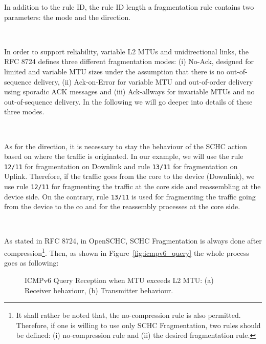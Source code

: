 In addition to the rule ID, the rule ID length a fragmentation rule contains two  parameters: the mode and the direction.

~

In order to support reliability, variable L2 MTUs and unidirectional links, the RFC 8724 defines three different fragmentation modes: (i) No-Ack, designed for limited and variable MTU sizes under the assumption that there is no out-of-sequence delivery, (ii) Ack-on-Error for variable MTU and out-of-order delivery using sporadic ACK messages and (iii) Ack-allways for invariable MTUs and no out-of-sequence delivery.
In the following we will go deeper into details of these three modes.

~

As for the direction, it is necessary to stay the behaviour of the SCHC action based on where the traffic is originated.
In our example, we will use the rule \texttt{12/11} for fragmentation on Downlink and rule \texttt{13/11} for fragmentation on Uplink.
Therefore, if the traffic goes from the core to the device (Downlink), we use rule \texttt{12/11} for fragmenting the traffic at the core side and reassembling at the device side.
On the contrary, rule \texttt{13/11} is used for fragmenting the traffic going from the device to the co and for the reassembly processes at the core side.

~

As stated in RFC 8724, in OpenSCHC, SCHC Fragmentation is always done after compression\footnote{It shall rather be noted that, the no-compression rule is also permitted. Therefore, if one is willing to use only SCHC Fragmentation, two rules should be defined: (i) no-compression rule and (ii) the desired fragmentation rule.}. 
Then, as shown in Figure~\ref{fig:icmpv6_query} the whole process goes as following:

\begin{figure}[!tbp]
  \begin{minipage}[b]{0.33\columnwidth}
  \centering
    
  \end{minipage}
  \hfill
  \begin{minipage}[b]{0.33\columnwidth}
  \centering
    
  \end{minipage}
\caption{ICMPv6 Query Reception when MTU exceeds L2 MTU: (a) Receiver behaviour, (b) Transmitter behaviour.}    \label{fig-icmpv6_query}
\end{figure}


